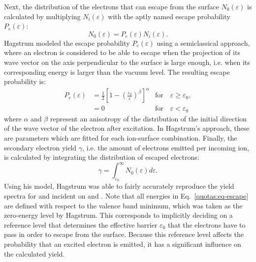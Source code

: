 \begin{refsection}
Next, the distribution of the electrons that can escape from the surface $N_0(\varepsilon)$ is calculated by multiplying $N_i(\varepsilon)$ with the aptly named escape probability $P_e(\varepsilon)$:
\begin{equation}
N_0(\varepsilon) = P_e (\varepsilon) N_i (\varepsilon).
\end{equation}
Hagstrum modeled the escape probability $P_e(\varepsilon)$ using a semiclassical approach, where an electron is considered to be able to escape when the projection of its wave vector on the axis perpendicular to the surface is large enough, i.e. when its corresponding energy is larger than the vacuum level. The resulting escape probability is:
\begin{equation} \label{quotas:eq-escape}
\begin{aligned}
P_e(\varepsilon) &= \frac{1}{2}\left[1 - \left(\frac{\varepsilon_0}{\varepsilon}\right)^\beta\right]^\alpha & \text{for} \hspace{1em}\varepsilon \geq \varepsilon_0, \\
&= 0 &\text{for} \hspace{1em}\varepsilon < \varepsilon_0
\end{aligned}
\end{equation}
where $\alpha$ and $\beta$ represent an anisotropy of the distribution of the initial direction of the wave vector of the electron after excitation. In Hagstrum's approach, these are parameters which are fitted for each ion-surface combination.  Finally, the secondary electron yield $\gamma$, i.e. the amount of electrons emitted per incoming ion, is calculated by integrating the distribution of escaped electrons:
\begin{equation} \label{quotas:eq-yield}
\gamma = \int_{\varepsilon_0}^\infty N_0(\varepsilon) d\varepsilon.
\end{equation}
Using his model, Hagstrum was able to fairly accurately reproduce the yield spectra for  and  incident on  and . Note that all energies in Eq.~\ref{quotas:eq-escape} are defined with respect to the valence band minimum, which was taken as the zero-energy level by Hagstrum. This corresponds to implicitly deciding on a reference level that determines the effective barrier $\varepsilon_0$ that the electrons have to pass in order to escape from the surface. Because this reference level affects the probability that an excited electron is emitted, it has a significant influence on the calculated yield.\\


\end{refsection}
